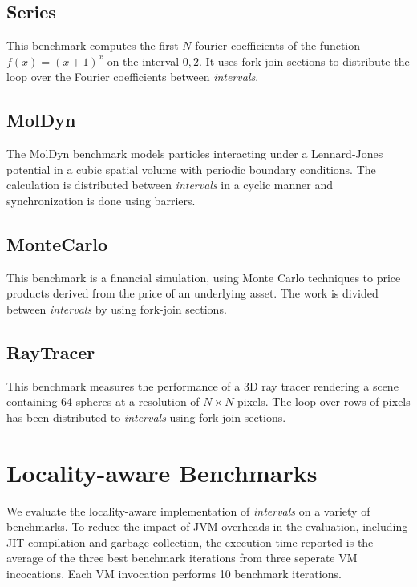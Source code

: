 \subsection*{Series}

This benchmark computes the first $N$ fourier coefficients of the
function $f(x) = (x+1)^x$ on the interval $0,2$. It uses fork-join
sections to distribute the loop over the Fourier coefficients between
\emph{intervals}.

\subsection*{MolDyn}

The MolDyn benchmark models particles interacting under a
Lennard-Jones potential in a cubic spatial volume with periodic
boundary conditions. The calculation is distributed between
\emph{intervals} in a cyclic manner and synchronization is done using
barriers.

\subsection*{MonteCarlo}

This benchmark is a financial simulation, using Monte Carlo techniques
to price products derived from the price of an underlying asset. The
work is divided between \emph{intervals} by using fork-join sections.

\subsection*{RayTracer}

This benchmark measures the performance of a 3D ray tracer rendering a
scene containing 64 spheres at a resolution of $N \times N$
pixels. The loop over rows of pixels has been distributed to
\emph{intervals} using fork-join sections.


\section{Locality-aware Benchmarks}

We evaluate the locality-aware implementation of \emph{intervals} on a
variety of benchmarks. To reduce the impact of JVM overheads in the
evaluation, including JIT compilation and garbage collection, the
execution time reported is the average of the three best benchmark
iterations from three seperate VM incocations. Each VM invocation
performs 10 benchmark iterations.

